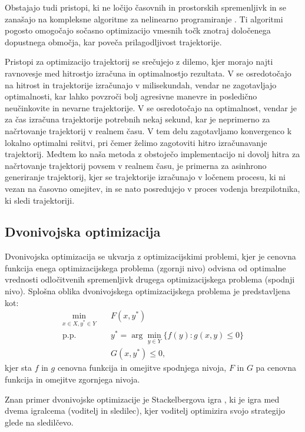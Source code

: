 \documentclass[isrm2, tisk]{fmfdelo}
\begin{document}
Obstajajo tudi pristopi, ki ne ločijo časovnih in prostorskih spremenljivk \cite{fridovich2018planning} in se zanašajo na kompleksne algoritme za nelinearno programiranje \cite{wachter2006implementation}. Ti algoritmi pogosto omogočajo sočasno optimizacijo vmesnih točk znotraj določenega dopustnega območja, kar poveča prilagodljivost trajektorije.

Pristopi za optimizacijo trajektorij se srečujejo z dilemo, kjer morajo najti ravnovesje med hitrostjo izračuna in optimalnostjo rezultata. V \cite{zhou2020ego} se osredotočajo na hitrost in trajektorije izračunajo v milisekundah, vendar ne zagotavljajo optimalnosti, kar lahko povzroči bolj agresivne manevre in posledično neučinkovite in nevarne trajektorije. V \cite{richter2016polynomial} se osredotočajo na optimalnost, vendar je za čas izračuna trajektorije potrebnih nekaj sekund, kar je neprimerno za načrtovanje trajektorij v realnem času. V tem delu zagotavljamo konvergenco k lokalno optimalni rešitvi, pri čemer želimo zagotoviti hitro izračunavanje trajektorij. Medtem ko naša metoda z obstoječo implementacijo ni dovolj hitra za načrtovanje trajektorij povsem v realnem času, je primerna za asinhrono generiranje trajektorij, kjer se trajektorije izračunajo v ločenem procesu, ki ni vezan na časovno omejitev, in se nato posredujejo v proces vodenja brezpilotnika, ki sledi trajektoriji.

\subsection{Dvonivojska optimizacija}
Dvonivojska optimizacija se ukvarja z optimizacijskimi problemi, kjer je cenovna funkcija enega optimizacijskega problema (zgornji nivo) odvisna od optimalne vrednosti odločitvenih spremenljivk drugega optimizacijskega problema (spodnji nivo). Splošna oblika dvonivojskega optimizacijskega problema je predstavljena kot:
\begin{equation}
    \begin{aligned}
        \min_{x\in X, y^*\in Y}& \quad F(x,y^*) \\
        \text{p.p.} & \quad y^* = \arg \min_{y\in Y} \{f(y) : g(x,y) \leq 0\} \\
        &\quad G(x,y^*) \leq 0,
    \end{aligned}
\end{equation}
kjer sta $f$ in $g$ cenovna funkcija in omejitve spodnjega nivoja, $F$ in $G$ pa cenovna funkcija in omejitve zgornjega nivoja.

Znan primer dvonivojske optimizacije je Stackelbergova igra \cite{von2010market}, ki je igra med dvema igralcema (voditelj in sledilec), kjer voditelj optimizira svojo strategijo glede na sledilčevo. 
\end{document}

